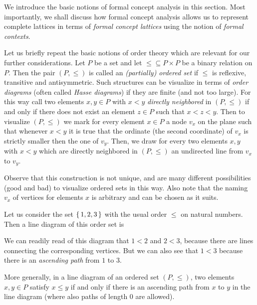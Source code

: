 We introduce the basic notions of formal concept analysis in this section.  Most
importantly, we shall discuss how formal concept analysis allows us to represent
complete lattices in terms of \emph{formal concept lattices} using the notion of
\emph{formal contexts}.

Let us briefly repeat the basic notions of order theory which are relevant for our further
considerations.  Let $P$ be a set and let ${\le} \subseteq P \times P$ be a binary
relation on $P$.  Then the pair $(P, \le)$ is called an \emph{(partially) ordered set} if
$\le$ is reflexive, transitive and antisymmetric.  Such structures can be visualize in
terms of \emph{order diagrams} (often called \emph{Hasse diagrams}) if they are finite
(and not too large).  For this way call two elements $x, y \in P$ with $x < y$
\emph{directly neighbored} in $(P, \le)$ if and only if there does not exist an element $z
\in P$ such that $x < z < y$.  Then to visualize $(P, \le)$ we mark for every element
$x \in P$ a node $v_x$ on the plane such that whenever $x < y$ it is true that the
ordinate (the second coordinate) of $v_x$ is strictly smaller then the one of $v_y$.
Then, we draw for every two elements $x, y$ with $x < y$ which are directly neighbored in
$(P, \le)$ an undirected line from $v_x$ to $v_y$.

Observe that this construction is not unique, and are many different possibilities (good
and bad) to visualize ordered sets in this way.  Also note that the naming $v_x$ of
vertices for elements $x$ is arbitrary and can be chosen as it suits.

\begin{Example}
  \label{expl:1}
  Let us consider the set ${\{\,1, 2, 3\,\}}$ with the usual order $\le$ on natural numbers.
  Then a line diagram of this order set is
  \begin{center}
  \end{center}
  We can readily read of this diagram that $1 < 2$ and $2 < 3$, because there are lines
  connecting the corresponding vertices.  But we can also see that $1 < 3$ because there
  is an \emph{ascending path} from $1$ to $3$.
\end{Example}

More generally, in a line diagram of an ordered set $(P, \le)$, two elements $x, y \in P$
satisfy $x \le y$ if and only if there is an ascending path from $x$ to $y$ in the line
diagram (where also paths of length 0 are allowed).


